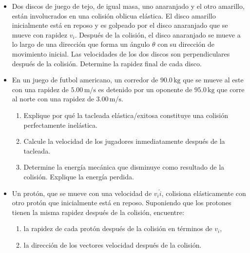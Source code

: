 \documentclass[11pt,a4paper]{article}
\begin{document}
\newpage

\begin{itemize}
    \item[\textbf{21.}] Dos discos de juego de tejo, de igual masa, uno anaranjado y el otro amarillo, están involucrados en una colisión oblicua elástica. El disco amarillo inicialmente está en reposo y es golpeado por el disco anaranjado que se mueve con rapidez \(v_i\). Después de la colisión, el disco anaranjado se mueve a lo largo de una dirección que forma un ángulo \(\theta\) con su dirección de movimiento inicial. Las velocidades de los dos discos son perpendiculares después de la colisión. Determine la rapidez final de cada disco.
    \vspace*{6cm}

    \item[\textbf{22.}] En un juego de futbol americano, un corredor de \(90.0\,\text{kg}\) que se mueve al este con una rapidez de \(5.00\,\text{m/s}\) es detenido por un oponente de \(95.0\,\text{kg}\) que corre al norte con una rapidez de \(3.00\,\text{m/s}\).
    \begin{enumerate}
        \item Explique por qué la tacleada elástica/exitosa constituye una colisión perfectamente inelástica.
        \item Calcule la velocidad de los jugadores inmediatamente después de la tacleada.
        \item Determine la energía mecánica que disminuye como resultado de la colisión. Explique la energía perdida.
    \end{enumerate}
    \vspace*{6cm}

    \item[\textbf{23.}] Un protón, que se mueve con una velocidad de \(v_i \hat{i}\), colisiona elásticamente con otro protón que inicialmente está en reposo. Suponiendo que los protones tienen la misma rapidez después de la colisión, encuentre:
    \begin{enumerate}
        \item la rapidez de cada protón después de la colisión en términos de \(v_i\),
        \item la dirección de los vectores velocidad después de la colisión.
    \end{enumerate}
    \vspace*{6cm}
\end{itemize}

\newpage
\end{document}
